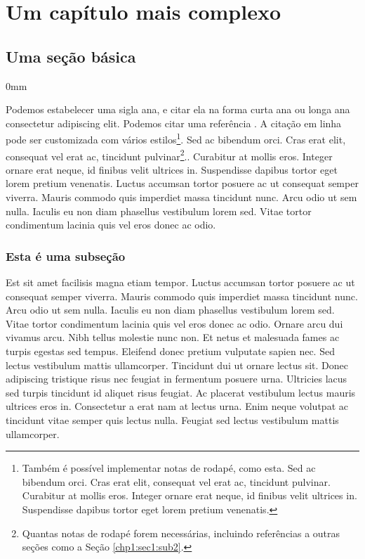 \documentclass[./main.tex]{subfiles}
\begin{document}
\chapter{Um capítulo mais complexo} \label{chap:2}
\thispagestyle{fancy}

\section{Uma seção básica} \label{chp2:sec1}

\begin{adjustwidth}{\bodytab}{0mm}
\par Podemos estabelecer uma sigla \gls{ana}, e citar ela na forma curta \acrshort{ana} ou longa \acrlong{ana} consectetur adipiscing elit. Podemos citar uma referência \cite{descartes2008discurso}. A citação em linha pode ser customizada com vários estilos\footnote{Também é possível implementar notas de rodapé, como esta. Sed ac bibendum orci. Cras erat elit, consequat vel erat ac, tincidunt pulvinar. Curabitur at mollis eros. Integer ornare erat neque, id finibus velit ultrices in. Suspendisse dapibus tortor eget lorem pretium venenatis.}. Sed ac bibendum orci. Cras erat elit, consequat vel erat ac, tincidunt pulvinar\footnote{Quantas notas de rodapé forem necessárias, incluindo referências a outras seções como a Seção \ref{chp1:sec1:sub2}.}.. Curabitur at mollis eros. Integer ornare erat neque, id finibus velit ultrices in. Suspendisse dapibus tortor eget lorem pretium venenatis. Luctus accumsan tortor posuere ac ut consequat semper viverra. Mauris commodo quis imperdiet massa tincidunt nunc. Arcu odio ut sem nulla. Iaculis eu non diam phasellus vestibulum lorem sed. Vitae tortor condimentum lacinia quis vel eros donec ac odio. 

\subsection{Esta é uma subseção} \label{chp2:sec1:sub1}

\par Est sit amet facilisis magna etiam tempor. Luctus accumsan tortor posuere ac ut consequat semper viverra. Mauris commodo quis imperdiet massa tincidunt nunc. Arcu odio ut sem nulla. Iaculis eu non diam phasellus vestibulum lorem sed. Vitae tortor condimentum lacinia quis vel eros donec ac odio. Ornare arcu dui vivamus arcu. Nibh tellus molestie nunc non. Et netus et malesuada fames ac turpis egestas sed tempus. Eleifend donec pretium vulputate sapien nec. Sed lectus vestibulum mattis ullamcorper. Tincidunt dui ut ornare lectus sit. Donec adipiscing tristique risus nec feugiat in fermentum posuere urna. Ultricies lacus sed turpis tincidunt id aliquet risus feugiat. Ac placerat vestibulum lectus mauris ultrices eros in. Consectetur a erat nam at lectus urna. Enim neque volutpat ac tincidunt vitae semper quis lectus nulla. Feugiat sed lectus vestibulum mattis ullamcorper.


\end{adjustwidth}
\end{document}
